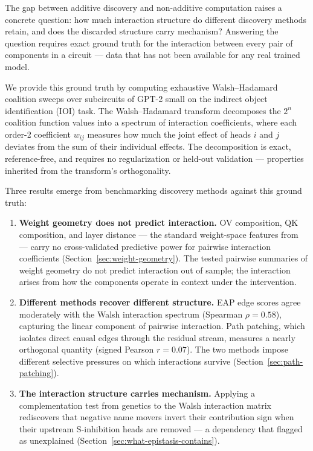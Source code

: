 \documentclass{article}
\begin{document}
The gap between additive discovery and non-additive computation raises a
concrete question: how much interaction structure do different discovery
methods retain, and does the discarded structure carry mechanism? Answering
the question requires exact ground truth for the interaction between every pair
of components in a circuit --- data that has not been
available for any real trained model.

We provide this ground truth by computing exhaustive Walsh--Hadamard
coalition sweeps over subcircuits of GPT-2 small on the indirect object
identification (IOI) task. The Walsh--Hadamard transform decomposes the
$2^n$ coalition function values into a spectrum of interaction
coefficients, where each order-2 coefficient $w_{ij}$ measures how much
the joint effect of heads $i$ and $j$ deviates from the sum of their
individual effects. The decomposition is exact, reference-free, and
requires no regularization or held-out validation --- properties
inherited from the transform's orthogonality.

Three results emerge from benchmarking discovery methods against this
ground truth:

\begin{enumerate}
\item \textbf{Weight geometry does not predict interaction.} OV composition, QK
  composition, and layer distance --- the standard weight-space features
  from \citet{elhage2021mathematical} --- carry no cross-validated
  predictive power for pairwise interaction coefficients
  (Section~\ref{sec:weight-geometry}). The tested pairwise summaries of weight geometry do not predict interaction out of sample; the interaction arises from how the components operate in context under the intervention.

\item \textbf{Different methods recover different structure.} EAP edge
  scores agree moderately with the Walsh interaction spectrum (Spearman
  $\rho = 0.58$), capturing the linear component of pairwise
  interaction. Path patching, which isolates direct causal edges through
  the residual stream, measures a nearly orthogonal quantity (signed
  Pearson $r = 0.07$). The two methods impose different selective
  pressures on which interactions survive
  (Section~\ref{sec:path-patching}).

\item \textbf{The interaction structure carries mechanism.} Applying a
  complementation test from genetics to the Walsh interaction matrix
  rediscovers that negative name movers invert their contribution sign
  when their upstream S-inhibition heads are removed --- a dependency that \citet{wang2022ioi} flagged as unexplained
  (Section~\ref{sec:what-epistasis-contains}).
\end{enumerate}
\end{document}
